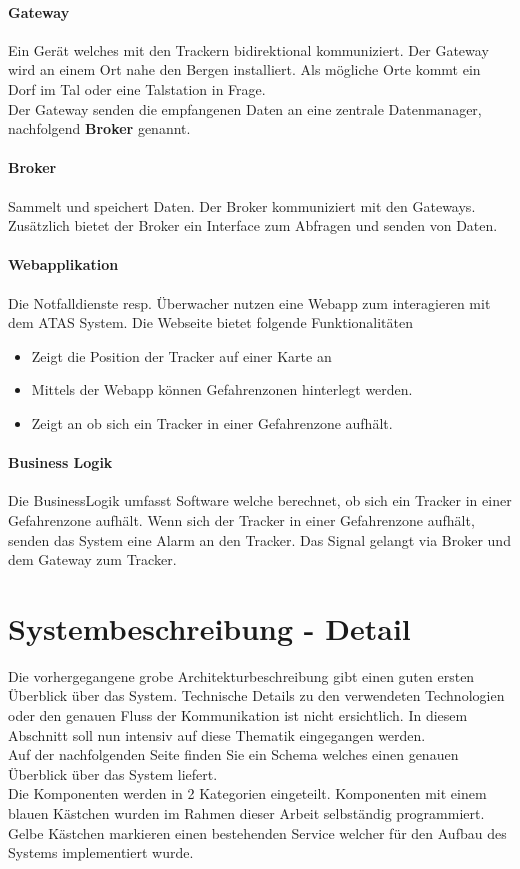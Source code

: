 \documentclass[11pt,english,german]{report}
\theoremstyle{definition}
\begin{document}
\subsubsection{Gateway}
Ein Gerät welches mit den Trackern bidirektional kommuniziert. Der Gateway wird an einem Ort nahe den Bergen installiert. Als mögliche Orte kommt ein Dorf im Tal oder eine Talstation in Frage.\bigskip \\
Der Gateway senden die empfangenen Daten an eine zentrale Datenmanager, nachfolgend \textbf{Broker} genannt.

\subsubsection{Broker}
Sammelt und speichert Daten. Der Broker kommuniziert mit den Gateways. Zusätzlich bietet der Broker ein Interface zum Abfragen und senden von Daten.

\subsubsection{Webapplikation}
Die Notfalldienste resp. Überwacher nutzen eine Webapp zum interagieren mit dem ATAS System. Die Webseite bietet folgende Funktionalitäten
\begin{itemize}
	\item
		Zeigt die Position der Tracker auf einer Karte an 
	\item
		Mittels der Webapp können Gefahrenzonen hinterlegt werden.
	\item 
		Zeigt an ob sich ein Tracker in einer Gefahrenzone aufhält.	
\end{itemize}

\subsubsection{Business Logik}
Die BusinessLogik umfasst Software welche berechnet, ob sich ein Tracker in einer Gefahrenzone aufhält. Wenn sich der Tracker in einer Gefahrenzone aufhält, senden das System eine Alarm an den Tracker. Das Signal gelangt via Broker und dem Gateway zum Tracker.

\newpage
\chapter{Systembeschreibung - Detail}
Die vorhergegangene grobe Architekturbeschreibung gibt einen guten ersten Überblick über das System. Technische Details zu  den verwendeten Technologien oder den genauen Fluss der Kommunikation ist nicht ersichtlich. In diesem Abschnitt soll nun intensiv auf diese Thematik eingegangen werden.\\[0.3cm]
Auf der nachfolgenden Seite finden Sie ein Schema welches einen genauen Überblick über das System liefert.\\[0.3cm]
Die Komponenten werden in 2 Kategorien eingeteilt. Komponenten mit einem blauen Kästchen wurden im Rahmen dieser Arbeit selbständig programmiert. Gelbe Kästchen markieren einen bestehenden Service welcher für den Aufbau des Systems implementiert wurde. 
\end{document}
